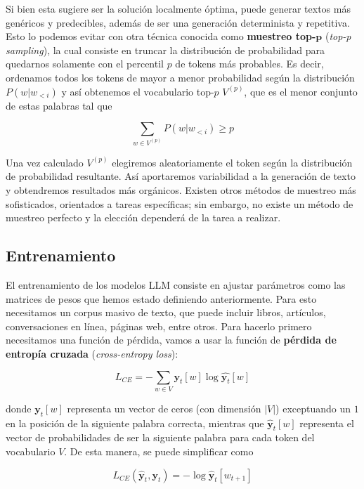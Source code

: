 \documentclass[12pt,twoside]{article}
\newcommand{\abs}[1]{\ensuremath{|#1|}}
\begin{document}
Si bien esta sugiere ser la solución localmente óptima, puede generar textos más genéricos y predecibles, además de ser una generación determinista y repetitiva. Esto lo podemos evitar con otra técnica conocida como \textbf{muestreo top-}$\boldsymbol{p}$ (\textit{top-p sampling}), la cual consiste en truncar la distribución de probabilidad para quedarnos solamente con el percentil $p$ de tokens más probables. Es decir, ordenamos todos los tokens de mayor a menor probabilidad según la distribución $P(w|w_{<i})$ y así obtenemos el vocabulario top-$p$ $V^{(p)}$, que es el menor conjunto de estas palabras tal que

\begin{equation}
    \sum_{w\in V^{(p)}}P(w|w_{<i})\geq p
\end{equation}

Una vez calculado $V^{(p)}$ elegiremos aleatoriamente el token según la distribución de probabilidad resultante. Así aportaremos variabilidad a la generación de texto y obtendremos resultados más orgánicos. Existen otros métodos de muestreo más sofisticados, orientados a tareas específicas; sin embargo, no existe un método de muestreo perfecto y la elección dependerá de la tarea a realizar.

\subsection{Entrenamiento}
El entrenamiento de los modelos LLM consiste en ajustar parámetros como las matrices de pesos que hemos estado definiendo anteriormente. Para esto necesitamos un corpus masivo de texto, que puede incluir libros, artículos, conversaciones en línea, páginas web, entre otros. Para hacerlo primero necesitamos una función de pérdida, vamos a usar la función de \textbf{pérdida de entropía cruzada} (\textit{cross-entropy loss}):

\begin{equation}
    L_{CE}=-\sum_{w\in V}\mathbf{y}_t[w]\log \hat{\mathbf{y}_t}[w]
\end{equation}

donde $\mathbf{y}_t[w]$ representa un vector de ceros (con dimensión $\abs{V}$) exceptuando un $1$ en la posición de la siguiente palabra correcta, mientras que $\hat{\mathbf{y}}_t[w]$ representa el vector de probabilidades de ser la siguiente palabra para cada token del vocabulario $V$.
De esta manera, se puede simplificar como

\begin{equation}
    L_{CE}(\hat{\mathbf{y}}_t,\mathbf{y}_t)=-\log\hat{\mathbf{y}}_t[w_{t+1}]
\end{equation}
\end{document}
